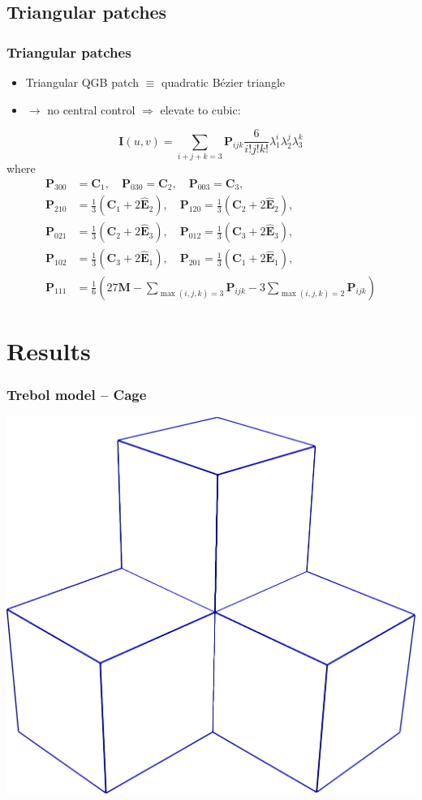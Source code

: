 \documentclass{beamer}
\begin{document}
\subsection{Triangular patches}

\begin{frame}
  \frametitle{Triangular patches}
  \begin{itemize}
  \item Triangular QGB patch $\equiv$ quadratic B\'ezier triangle
  \item $\rightarrow$ no central control $\Rightarrow$ elevate to cubic:
  \end{itemize}
  \vspace{1em}
  \[\mathbf{I}(u,v)=\sum_{i+j+k=3}\mathbf{P}_{ijk}\frac{6}{i!j!k!}\lambda_{1}^{i}\lambda_{2}^{j}\lambda_{3}^{k}\]
  where
  \[\begin{aligned}
  \mathbf{P}_{300}&=\mathbf{C}_{1},\quad\mathbf{P}_{030}=\mathbf{C}_{2},\quad\mathbf{P}_{003}=\mathbf{C}_{3},\\\mathbf{P}_{210}&=\frac{1}{3}(\mathbf{C}_{1}+2\hat{\mathbf{E}}_{2}),\quad\mathbf{P}_{120}=\frac{1}{3}(\mathbf{C}_{2}+2\hat{\mathbf{E}}_{2}),\\\mathbf{P}_{021}&=\frac{1}{3}(\mathbf{C}_{2}+2\hat{\mathbf{E}}_{3}),\quad\mathbf{P}_{012}=\frac{1}{3}(\mathbf{C}_{3}+2\hat{\mathbf{E}}_{3}),\\\mathbf{P}_{102}&=\frac{1}{3}(\mathbf{C}_{3}+2\hat{\mathbf{E}}_{1}),\quad\mathbf{P}_{201}=\frac{1}{3}(\mathbf{C}_{1}+2\hat{\mathbf{E}}_{1}),\\
  \mathbf{P}_{111}&=\frac{1}{6}(27\mathbf{M}-\sum_{\max(i,j,k)=3}\mathbf{P}_{ijk}-3\sum_{\max(i,j,k)=2}\mathbf{P}_{ijk})
  \end{aligned}\]
\end{frame}

\section{Results}

\begin{frame}
  \frametitle{Trebol model -- Cage}
  \centering
  \includegraphics[width=.7\textwidth]{images/trebol-cage.png}
\end{frame}
\end{document}
